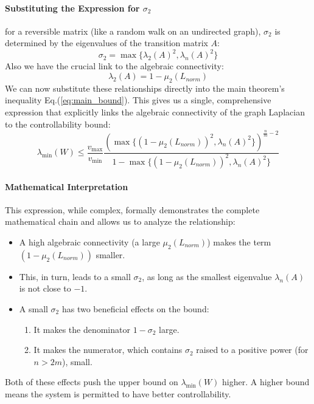 \documentclass[10pt, a4paper]{article}
\begin{document}
\paragraph{Substituting the Expression for $\sigma_2$}
for a reversible matrix (like a random walk on an undirected graph), $\sigma_2$ is determined by the eigenvalues of the transition matrix $A$:
\begin{equation}
    \sigma_2 = \max\{\lambda_2(A)^2, \lambda_n(A)^2\}
\end{equation}
Also we have the crucial link to the algebraic connectivity:
\begin{equation}
    \lambda_2(A) = 1 - \mu_2(L_{norm})
\end{equation}
We can now substitute these relationships directly into the main theorem's inequality Eq.(\ref{eq:main_bound}). This gives us a single, comprehensive expression that explicitly links the algebraic connectivity of the graph Laplacian to the controllability bound:
\begin{equation}
    \lambda_{\min}(W) \le \frac{v_{\max}}{v_{\min}} \frac{ \left( \max\{(1-\mu_2(L_{norm}))^2, \lambda_n(A)^2\} \right)^{\frac{n}{m}-2} }{ 1 - \max\{(1-\mu_2(L_{norm}))^2, \lambda_n(A)^2\} }
\end{equation}
\paragraph{Mathematical Interpretation}
This expression, while complex, formally demonstrates the complete mathematical chain and allows us to analyze the relationship:
\begin{itemize}
    \item A high algebraic connectivity (a large $\mu_2(L_{norm})$) makes the term $(1-\mu_2(L_{norm}))$ smaller.
    \item This, in turn, leads to a small $\sigma_2$, as long as the smallest eigenvalue $\lambda_n(A)$ is not close to $-1$.
    \item A small $\sigma_2$ has two beneficial effects on the bound:
    \begin{enumerate}
        \item It makes the denominator $1-\sigma_2$ large.
        \item It makes the numerator, which contains $\sigma_2$ raised to a positive power (for $n>2m$), small.
    \end{enumerate}
\end{itemize}
Both of these effects push the upper bound on $\lambda_{\min}(W)$ higher. A higher bound means the system is permitted to have better controllability.
\end{document}
